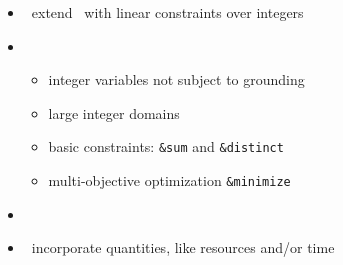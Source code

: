 \begin{frame}{\clingcon}
  \begin{itemize}
  \item {} \ extend \clingo\ with linear constraints over integers
  \item {} \
    \begin{itemize}
    \item integer variables not subject to grounding
    \item large integer domains
    \item basic constraints: \lstinline{&sum} and \lstinline{&distinct}
    \item multi-objective optimization \lstinline{&minimize}
    \end{itemize}
  \item {} \ \cite{ostsch12a,bakaossc16a}
  \item {} \ incorporate quantities, like resources and/or time
  \end{itemize}
\end{frame}
%
